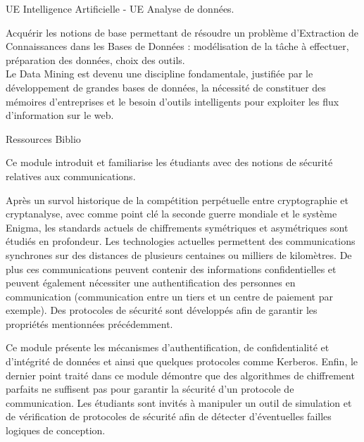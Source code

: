 {UE Intelligence Artificielle - UE Analyse de données.} 
{\begin{itemize} 
  \ObjItem Acquérir les notions de base permettant de résoudre un problème
d'Extraction de Connaissances dans les Bases de Données : modélisation de la tâche à effectuer, préparation des données, choix des outils.\\
Le Data
Mining est devenu une discipline fondamentale, justifiée par le
développement de grandes bases de données, la nécessité de constituer
des mémoires d'entreprises et le besoin d'outils intelligents pour exploiter
les flux d'information sur le web.
\end{itemize} 
} 
{Ressources} 
{Biblio} 
 
\vfill

{
Ce module introduit et familiarise les étudiants avec des notions de
sécurité relatives aux communications.

Après un survol historique de la compétition perpétuelle entre
cryptographie et cryptanalyse, avec comme point clé la seconde guerre
mondiale et le système Enigma, les standards actuels de chiffrements
symétriques et asymétriques sont étudiés en profondeur. Les technologies
actuelles permettent des communications synchrones sur des distances de
plusieurs centaines ou milliers de kilomètres. De plus ces communications
peuvent contenir des informations confidentielles et peuvent également
nécessiter une authentification des personnes en communication
(communication entre un tiers et un centre de paiement par exemple). Des
protocoles de sécurité sont développés afin de garantir les propriétés
mentionnées précédemment.

Ce module présente les mécanismes d'authentification, de confidentialité
et d'intégrité de données et ainsi que quelques protocoles comme
Kerberos. Enfin, le dernier point traité dans ce module démontre que des
algorithmes de chiffrement parfaits ne suffisent pas pour garantir la
sécurité d'un protocole de communication. Les étudiants sont invités à
manipuler un outil de simulation et de vérification de protocoles de
sécurité afin de détecter d'éventuelles failles logiques de conception.
} 

